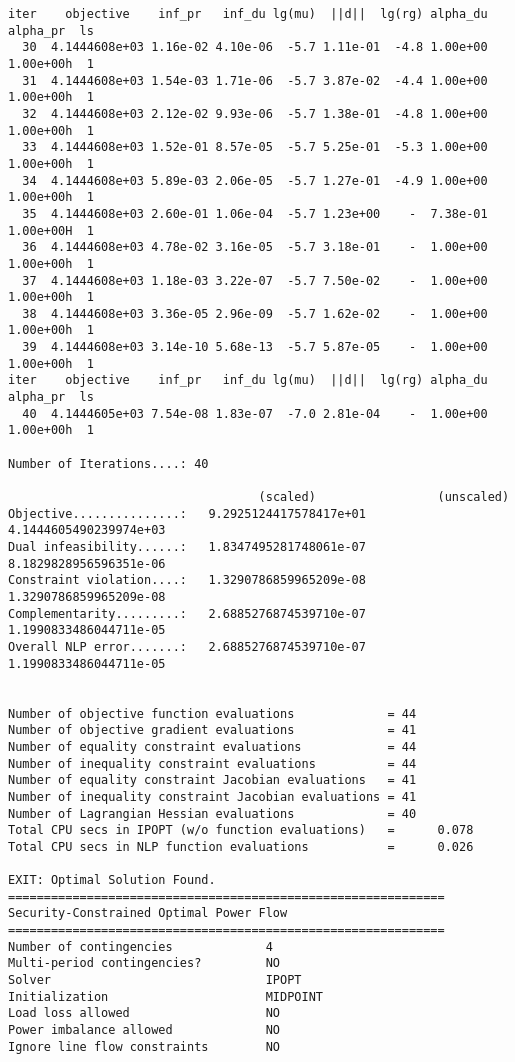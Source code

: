 \begin{lstlisting}
iter    objective    inf_pr   inf_du lg(mu)  ||d||  lg(rg) alpha_du alpha_pr  ls
  30  4.1444608e+03 1.16e-02 4.10e-06  -5.7 1.11e-01  -4.8 1.00e+00 1.00e+00h  1
  31  4.1444608e+03 1.54e-03 1.71e-06  -5.7 3.87e-02  -4.4 1.00e+00 1.00e+00h  1
  32  4.1444608e+03 2.12e-02 9.93e-06  -5.7 1.38e-01  -4.8 1.00e+00 1.00e+00h  1
  33  4.1444608e+03 1.52e-01 8.57e-05  -5.7 5.25e-01  -5.3 1.00e+00 1.00e+00h  1
  34  4.1444608e+03 5.89e-03 2.06e-05  -5.7 1.27e-01  -4.9 1.00e+00 1.00e+00h  1
  35  4.1444608e+03 2.60e-01 1.06e-04  -5.7 1.23e+00    -  7.38e-01 1.00e+00H  1
  36  4.1444608e+03 4.78e-02 3.16e-05  -5.7 3.18e-01    -  1.00e+00 1.00e+00h  1
  37  4.1444608e+03 1.18e-03 3.22e-07  -5.7 7.50e-02    -  1.00e+00 1.00e+00h  1
  38  4.1444608e+03 3.36e-05 2.96e-09  -5.7 1.62e-02    -  1.00e+00 1.00e+00h  1
  39  4.1444608e+03 3.14e-10 5.68e-13  -5.7 5.87e-05    -  1.00e+00 1.00e+00h  1
iter    objective    inf_pr   inf_du lg(mu)  ||d||  lg(rg) alpha_du alpha_pr  ls
  40  4.1444605e+03 7.54e-08 1.83e-07  -7.0 2.81e-04    -  1.00e+00 1.00e+00h  1

Number of Iterations....: 40

                                   (scaled)                 (unscaled)
Objective...............:   9.2925124417578417e+01    4.1444605490239974e+03
Dual infeasibility......:   1.8347495281748061e-07    8.1829828956596351e-06
Constraint violation....:   1.3290786859965209e-08    1.3290786859965209e-08
Complementarity.........:   2.6885276874539710e-07    1.1990833486044711e-05
Overall NLP error.......:   2.6885276874539710e-07    1.1990833486044711e-05


Number of objective function evaluations             = 44
Number of objective gradient evaluations             = 41
Number of equality constraint evaluations            = 44
Number of inequality constraint evaluations          = 44
Number of equality constraint Jacobian evaluations   = 41
Number of inequality constraint Jacobian evaluations = 41
Number of Lagrangian Hessian evaluations             = 40
Total CPU secs in IPOPT (w/o function evaluations)   =      0.078
Total CPU secs in NLP function evaluations           =      0.026

EXIT: Optimal Solution Found.
=============================================================
Security-Constrained Optimal Power Flow
=============================================================
Number of contingencies             4
Multi-period contingencies?         NO
Solver                              IPOPT
Initialization                      MIDPOINT
Load loss allowed                   NO
Power imbalance allowed             NO
Ignore line flow constraints        NO



\end{lstlisting}
